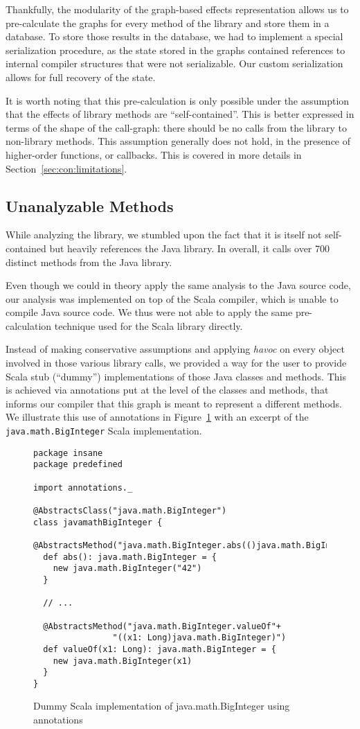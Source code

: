 Thankfully, the modularity of the graph-based effects representation allows us
to pre-calculate the graphs for every method of the library and store them in a
database. To store those results in the database, we had to implement a special
serialization procedure, as the state stored in the graphs contained references
to internal compiler structures that were not serializable. Our custom
serialization allows for full recovery of the state.

It is worth noting that this pre-calculation is only possible under the
assumption that the effects of library methods are ``self-contained''. This is better
expressed in terms of the shape of the call-graph: there should be no calls
from the library to non-library methods. This assumption generally does not
hold, in the presence of higher-order functions, or callbacks. This is covered in more
details in Section~\ref{sec:con:limitations}.

\subsection{Unanalyzable Methods}
While analyzing the library, we stumbled upon the fact that it is itself not
self-contained but heavily references the Java library. In overall, it calls
over 700 distinct methods from the Java library.

Even though we could in theory apply the same analysis to the Java source code, our
analysis was implemented on top of the Scala compiler, which is unable to
compile Java source code. We thus were not able to apply the same
pre-calculation technique used for the Scala library directly.

Instead of making conservative assumptions and applying \emph{havoc} on every
object involved in those various library calls, we provided a way for the user
to provide Scala stub (``dummy'') implementations of those Java classes and methods. This is
achieved via annotations put at the level of the classes and methods, that
informs our compiler that this graph is meant to represent a different methods.
We illustrate this use of annotations in Figure~\ref{fig:imp:annotations} with
an excerpt of the \lstinline{java.math.BigInteger} Scala implementation.
\begin{figure}[h]
    \centering
\begin{lstlisting}
package insane
package predefined

import annotations._

@AbstractsClass("java.math.BigInteger")
class javamathBigInteger {
  @AbstractsMethod("java.math.BigInteger.abs(()java.math.BigInteger)")
  def abs(): java.math.BigInteger = {
    new java.math.BigInteger("42")
  }

  // ...

  @AbstractsMethod("java.math.BigInteger.valueOf"+
                "((x1: Long)java.math.BigInteger)")
  def valueOf(x1: Long): java.math.BigInteger = {
    new java.math.BigInteger(x1)
  }
}
\end{lstlisting}
    \caption{Dummy Scala implementation of java.math.BigInteger using annotations}
    \label{fig:imp:annotations}
\end{figure}
